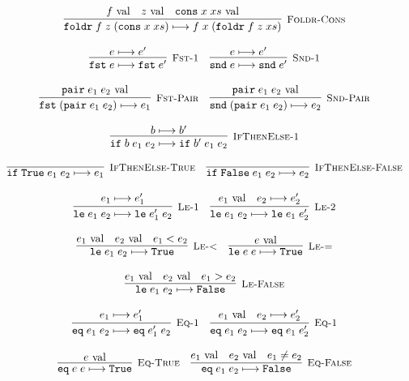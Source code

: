 \documentclass[10pt]{article}
\newcommand{\ttt}[1]{\texttt{#1}}
\newcommand{\reduces}{\ensuremath{\longmapsto}}
\newcommand{\val}{\textnormal{ val}}
\newcommand{\True}{\ttt{True}}
\newcommand{\False}{\ttt{False}}
\newcommand{\cons}{\ttt{cons}}
\newcommand{\foldr}{\ttt{foldr}}
\newcommand{\pair}{\ttt{pair}}
\newcommand{\fst}{\ttt{fst}}
\newcommand{\snd}{\ttt{snd}}
\newcommand{\ite}{\ttt{if}}
\newcommand{\lesseq}{\ttt{le}}
\newcommand{\eq}{\ttt{eq}}
\newcommand{\labinfer} [3] [] {\infer[{\small\textsc{#1}}]{#2}{#3}}
\begin{document}
\[\begin{array}{cc}
    \labinfer[Foldr-Cons]{\foldr\; f\; z\; (\cons\; x\; xs) \reduces f\; x\; (\foldr\; f\; z\; xs)}{f \val & z \val & \cons\; x\; xs \val}
    \\\\
    \labinfer[Fst-1]{\fst\; e \reduces \fst\; e'}{e \reduces e'}
    ~~~
    \labinfer[Snd-1]{\snd\; e \reduces \snd\; e'}{e \reduces e'}
    \\\\
    \labinfer[Fst-Pair]{\fst\; (\pair\; e_1\; e_2) \reduces e_1}{\pair\; e_1\; e_2 \val}
    ~~~
    \labinfer[Snd-Pair]{\snd\; (\pair\; e_1\; e_2) \reduces e_2}{\pair\; e_1\; e_2 \val}
    \\\\
    \labinfer[IfThenElse-1]{\ite\; b\; e_1\; e_2 \reduces \ite\; b'\; e_1\; e_2}{b \reduces b'}
    \\\\
    \labinfer[IfThenElse-True]{\ite\; \True\; e_1\; e_2 \reduces e_1}{}
    ~~~
    \labinfer[IfThenElse-False]{\ite\; \False\; e_1\; e_2 \reduces e_2}{}
    \\\\
    \labinfer[Le-1]{\lesseq\; e_1\; e_2 \reduces \lesseq\; e_1'\; e_2}{e_1 \reduces e_1'}
    ~~~
    \labinfer[Le-2]{\lesseq\; e_1\; e_2 \reduces \lesseq\; e_1\; e_2'}{e_1 \val & e_2 \reduces e_2'}
    \\\\
    \labinfer[Le-<]{\lesseq\; e_1\; e_2 \reduces \True}{e_1 \val & e_2 \val & e_1 < e_2}
    ~~~
    \labinfer[Le-=]{\lesseq\; e\; e \reduces \True}{e \val}
    \\\\
    \labinfer[Le-False]{\lesseq\; e_1\; e_2 \reduces \False}{e_1 \val & e_2 \val & e_1 > e_2}
    \\\\
    \labinfer[Eq-1]{\eq\; e_1\; e_2 \reduces \eq\; e_1'\; e_2}{e_1 \reduces e_1'}
    ~~~
    \labinfer[Eq-1]{\eq\; e_1\; e_2 \reduces \eq\; e_1\; e_2'}{e_1 \val & e_2 \reduces e_2'}
    \\\\
    \labinfer[Eq-True]{\eq\; e\; e \reduces \True}{e \val}
    ~~~
    \labinfer[Eq-False]{\eq\; e_1\; e_2 \reduces \False}{e_1 \val & e_2 \val & e_1 \neq e_2}
    
  \end{array}
\]
\end{document}
